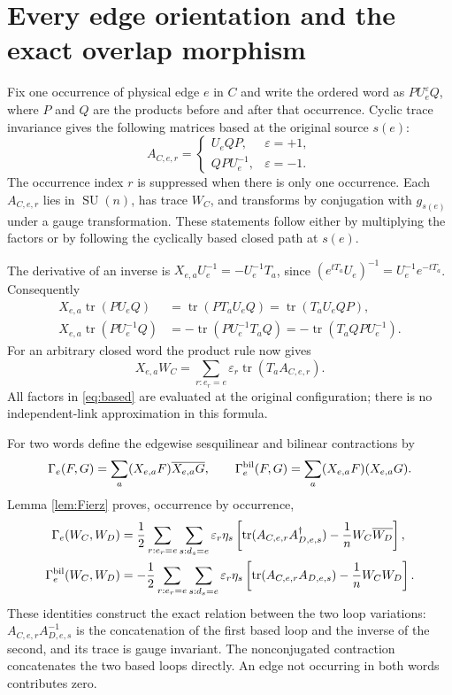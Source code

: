 \documentclass[11pt]{article}
\theoremstyle{definition}
\newcommand{\tr}{\operatorname{tr}}
\newcommand{\SU}{\operatorname{SU}}
\begin{document}
\section{Every edge orientation and the exact overlap morphism}

Fix one occurrence of physical edge $e$ in $C$ and write the ordered word
as $P U_e^{\varepsilon}Q$, where $P$ and $Q$ are the products before and
after that occurrence. Cyclic trace invariance gives the following
matrices based at the original source $s(e)$:
\begin{equation}\label{eq:based}
 A_{C,e,r}=
 \begin{cases}
 U_eQP,&\varepsilon=+1,\\
 QPU_e^{-1},&\varepsilon=-1.
 \end{cases}
\end{equation}
The occurrence index $r$ is suppressed when there is only one occurrence.
Each $A_{C,e,r}$ lies in $\SU(n)$, has trace $W_C$, and transforms by
conjugation with $g_{s(e)}$ under a gauge transformation. These statements
follow either by multiplying the factors or by following the cyclically
based closed path at $s(e)$.

The derivative of an inverse is
$X_{e,a}U_e^{-1}=-U_e^{-1}T_a$, since
$(e^{tT_a}U_e)^{-1}=U_e^{-1}e^{-tT_a}$. Consequently
\begin{align}
 X_{e,a}\tr(PU_eQ)&=\tr(PT_aU_eQ)=\tr(T_aU_eQP),\nonumber\\
 X_{e,a}\tr(PU_e^{-1}Q)&=-\tr(PU_e^{-1}T_aQ)
 =-\tr(T_aQPU_e^{-1}).\label{eq:orientations}
\end{align}
For an arbitrary closed word the product rule now gives
\begin{equation}\label{eq:repeatedderivative}
 X_{e,a}W_C=\sum_{r:e_r=e}\varepsilon_r\tr(T_aA_{C,e,r}).
\end{equation}
All factors in \eqref{eq:based} are evaluated at the original configuration;
there is no independent-link approximation in this formula.

For two words define the edgewise sesquilinear and bilinear contractions
by
\[
 \Gamma_e(F,G)=\sum_a(X_{e,a}F)\overline{X_{e,a}G},\qquad
 \Gamma_e^{\rm bil}(F,G)=\sum_a(X_{e,a}F)(X_{e,a}G).
\]
Lemma \ref{lem:Fierz} proves, occurrence by occurrence,
\begin{align}
\Gamma_e(W_C,W_D)
 &=\frac12\sum_{r:e_r=e}\sum_{s:d_s=e}\varepsilon_r\eta_s
 \left[\tr(A_{C,e,r}A_{D,e,s}^{\dagger})
       -\frac1nW_C\overline{W_D}\right],\label{eq:overlap-general}\\
\Gamma_e^{\rm bil}(W_C,W_D)
 &=-\frac12\sum_{r:e_r=e}\sum_{s:d_s=e}\varepsilon_r\eta_s
 \left[\tr(A_{C,e,r}A_{D,e,s})-\frac1nW_CW_D\right].
 \label{eq:overlap-bil-general}
\end{align}
These identities construct the exact relation between the two loop
variations: $A_{C,e,r}A_{D,e,s}^{-1}$ is the concatenation of the first
based loop and the inverse of the second, and its trace is gauge invariant.
The nonconjugated contraction concatenates the two based loops directly.
An edge not occurring in both words contributes zero.
\end{document}
